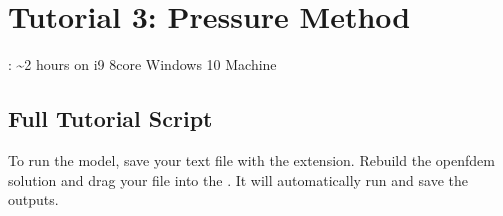 \documentclass[letterpaper,10pt,english]{sphinxmanual}
\begin{document}
\begin{sphinxVerbatim}[commandchars=\\\{\}]
 
    
    
    
    

 
\end{sphinxVerbatim}


\chapter{Tutorial 3: Pressure Method}
\label{\detokenize{rst_tutorials/tutorial3_pressure:tutorial-3-pressure-method}}\label{\detokenize{rst_tutorials/tutorial3_pressure::doc}}
: \textasciitilde{}2 hours on i9 8\sphinxhyphen{}core Windows 10 Machine


\section{Full Tutorial Script}
\label{\detokenize{rst_tutorials/tutorial3_pressure:full-tutorial-script}}
To run the model, save your text file with the  extension. Rebuild the openfdem solution and drag your
 file into the . It will automatically run and save the outputs.
\end{document}
